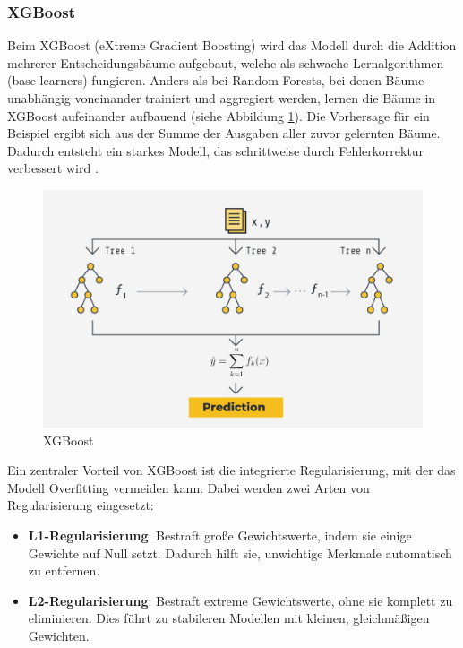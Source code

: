 \subsubsection{XGBoost}

Beim XGBoost (eXtreme Gradient Boosting) wird das Modell durch die Addition mehrerer Entscheidungsbäume aufgebaut, welche als
schwache Lernalgorithmen (base learners) fungieren.
Anders als bei Random Forests, bei denen Bäume unabhängig voneinander trainiert und aggregiert werden, 
lernen die Bäume in XGBoost aufeinander aufbauend (siehe Abbildung \ref{fig:xgboost}). Die Vorhersage für ein Beispiel ergibt sich aus der Summe der 
Ausgaben aller zuvor gelernten Bäume. Dadurch entsteht ein starkes Modell, das schrittweise durch Fehlerkorrektur 
verbessert wird \cite{petrovic2024,chen2016xgboost,aslam2022}.

\begin{figure}[htbp]
    \begin{center}
        \includegraphics[scale=0.25]{static/xgboost-pipeline.jpg}
        \caption[XGBoost]{\label{fig:xgboost} XGBoost\footnotemark}
    \end{center}
\end{figure}

Ein zentraler Vorteil von XGBoost ist die integrierte Regularisierung, mit der das Modell Overfitting vermeiden kann. 
Dabei werden zwei Arten von Regularisierung eingesetzt:

\begin{itemize}
    \item \textbf{L1-Regularisierung}: Bestraft große Gewichtswerte, indem sie einige Gewichte auf Null setzt. 
        Dadurch hilft sie, unwichtige Merkmale automatisch zu entfernen.
    \item \textbf{L2-Regularisierung}: Bestraft extreme Gewichtswerte, ohne sie komplett zu eliminieren. 
        Dies führt zu stabileren Modellen mit kleinen, gleichmäßigen Gewichten.
\end{itemize}

